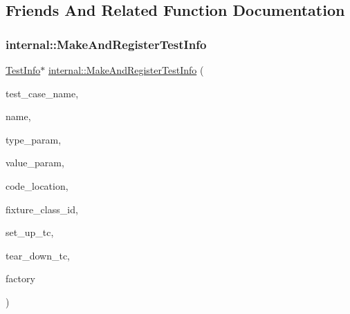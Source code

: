 \subsection{Friends And Related Function Documentation}
\mbox{\label{classtesting_1_1_test_info_a70ddf8a12d8c05f17429f6381abc8ace}} 
\subsubsection{\texorpdfstring{internal::MakeAndRegisterTestInfo}{internal::MakeAndRegisterTestInfo}}
{\footnotesize\ttfamily \mbox{\hyperlink{classtesting_1_1_test_info}{Test\+Info}}$\ast$ \mbox{\hyperlink{namespacetesting_1_1internal_adbaeb4f56e1d50cdc1d58c0be1d40527}{internal\+::\+Make\+And\+Register\+Test\+Info}} (\begin{DoxyParamCaption}\item[{const char $\ast$}]{test\+\_\+case\+\_\+name,  }\item[{const char $\ast$}]{name,  }\item[{const char $\ast$}]{type\+\_\+param,  }\item[{const char $\ast$}]{value\+\_\+param,  }\item[{\mbox{\hyperlink{structtesting_1_1internal_1_1_code_location}{internal\+::\+Code\+Location}}}]{code\+\_\+location,  }\item[{\mbox{\hyperlink{namespacetesting_1_1internal_ab1114197d3c657d8b7f8e0c5caa12d00}{internal\+::\+Type\+Id}}}]{fixture\+\_\+class\+\_\+id,  }\item[{\mbox{\hyperlink{classtesting_1_1_test_a5f2a051d1d99c9b784c666c586186cf9}{Test\+::\+Set\+Up\+Test\+Case\+Func}}}]{set\+\_\+up\+\_\+tc,  }\item[{\mbox{\hyperlink{classtesting_1_1_test_aa0f532e93b9f3500144c53f31466976c}{Test\+::\+Tear\+Down\+Test\+Case\+Func}}}]{tear\+\_\+down\+\_\+tc,  }\item[{\mbox{\hyperlink{classtesting_1_1internal_1_1_test_factory_base}{internal\+::\+Test\+Factory\+Base}} $\ast$}]{factory }\end{DoxyParamCaption})\hspace{0.3cm}{\ttfamily [friend]}}

\mbox{\label{classtesting_1_1_test_info_adc037d188dab349a94868991955c9cd4}} 
